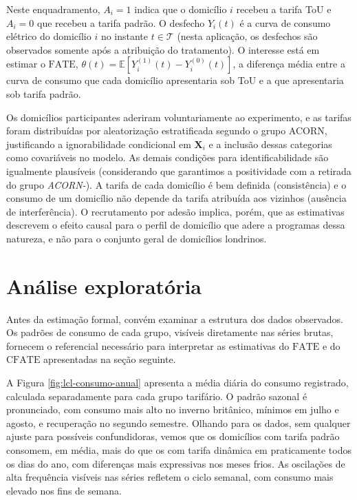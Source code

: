 Neste enquadramento, \(A_i = 1\) indica que o domicílio \(i\) recebeu a tarifa ToU e \(A_i = 0\) que recebeu a tarifa padrão. 
O desfecho \(Y_i(t)\) é a curva de consumo elétrico do domicílio \(i\) no instante \(t \in \mathcal{T}\) (nesta aplicação, os desfechos são observados somente após a atribuição do tratamento). 
O interesse está em estimar o \(\mathrm{FATE}\), \(\theta(t) = \mathbb{E}[Y_i^{(1)}(t) - Y_i^{(0)}(t)]\), a diferença média entre a curva de consumo que cada domicílio apresentaria sob ToU e a que apresentaria sob tarifa padrão.

Os domicílios participantes aderiram voluntariamente ao experimento, e as tarifas foram distribuídas por aleatorização estratificada segundo o grupo ACORN, justificando a ignorabilidade condicional em \(\mathbf{X}_i\) e a inclusão dessas categorias como covariáveis no modelo. 
As demais condições para identificabilidade são igualmente plausíveis (considerando que garantimos a positividade com a retirada do grupo \emph{ACORN-}). 
A tarifa de cada domicílio é bem definida (consistência) e o consumo de um domicílio não depende da tarifa atribuída aos vizinhos (ausência de interferência). 
O recrutamento por adesão implica, porém, que as estimativas descrevem o efeito causal para o perfil de domicílio que adere a programas dessa natureza, e não para o conjunto geral de domicílios londrinos.

\section{Análise exploratória}\label{sec-aplicacoes-exploratoria}

Antes da estimação formal, convém examinar a estrutura dos dados observados.
Os padrões de consumo de cada grupo, visíveis diretamente nas séries brutas, fornecem o referencial necessário para interpretar as estimativas do \(\mathrm{FATE}\) e do \(\mathrm{CFATE}\) apresentadas na seção seguinte.

A Figura \ref{fig:lcl-consumo-anual} apresenta a média diária do consumo registrado, calculada separadamente para cada grupo tarifário.
O padrão sazonal é pronunciado, com consumo mais alto no inverno britânico, mínimos em julho e agosto, e recuperação no segundo semestre.
Olhando para os dados, sem qualquer ajuste para possíveis confundidoras, vemos que os domicílios com tarifa padrão consomem, em média, mais do que os com tarifa dinâmica em praticamente todos os dias do ano, com diferenças mais expressivas nos meses frios.
As oscilações de alta frequência visíveis nas séries refletem o ciclo semanal, com consumo mais elevado nos fins de semana.

